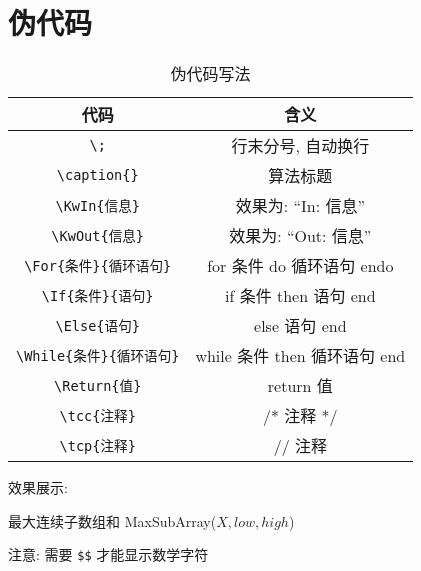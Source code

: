\section{伪代码}

\begin{table}[h]
\centering
\begin{tabular}{cc}
\toprule
\textbf{代码} & \textbf{含义} \\
\midrule
\verb|\;| & 行末分号, 自动换行 \\
\verb|\caption{}| & 算法标题 \\
\verb|\KwIn{信息}| & 效果为: “In: 信息” \\
\verb|\KwOut{信息}| & 效果为: “Out: 信息” \\
\verb|\For{条件}{循环语句}| & for 条件 do 循环语句 endo \\
\verb|\If{条件}{语句}| & if 条件 then 语句 end \\
\verb|\Else{语句}| & else 语句 end \\
\verb|\While{条件}{循环语句}| & while 条件 then 循环语句 end \\
\verb|\Return{值}| & return 值 \\
\verb|\tcc{注释}| & /* 注释 */ \\
\verb|\tcp{注释}| & // 注释 \\
\bottomrule
\end{tabular}
\caption{伪代码写法}
\end{table}

\noindent 效果展示:

\begin{algorithm}[H]
\caption{最大连续子数组和 MaxSubArray($X, low, high$)}
\end{algorithm}

\noindent 注意: 需要 \verb|$$| 才能显示数学字符

